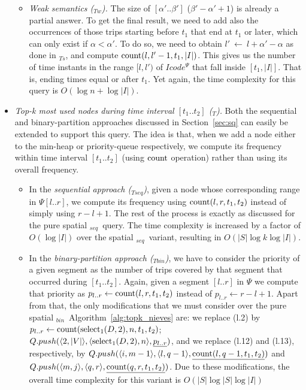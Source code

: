 \begin{itemize}
\begin{itemize}
			
			\item {\em Weak semantics (\XtoY$_{Tw}$).}
			The size of $[\alpha'..\beta']$ ($\beta' - \alpha' + 1$) is already a partial answer. To get the final result, we need to add 
			also the occurrences of those trips starting before $t_1$ that end at $t_1$ or later, which can only exist if $\alpha<\alpha'$. 
			To do so, we need to obtain $l'~\leftarrow~l+\alpha'-\alpha$ as done in \XtoY$_{Ts}$, and compute $\operatorname{count}(l,l'-1, t_1, |I|)$. This gives us the number of time instants in the range $[l,l')$ of  $Icode^{\Psi}$ that fall inside $[t_1, |I|]$. 
			That is, ending times equal or after $t_1$. Yet again, the time complexity for this query is $O(\log n + \log|I|)$.
		\end{itemize}
		
		


	\item {\em Top-k most used nodes during  time interval $[t_1..t_2]$ (\topK$_T$).}
	Both the sequential and binary-partition approaches discussed in Section~\ref{sec:sq} can easily
	be extended to support this query. The idea is that, when we add a node either to the min-heap or priority-queue
	respectively, we compute its frequency within time interval $[t_1..t_2]$ (using $\operatorname{count}$ operation) 
	rather than using its overall frequency.

	\begin{itemize}
		\item In the {\em sequential approach (\topK$_{Tseq}$)}, given a node whose corresponding range
		in $\Psi[l..r]$, we compute its frequency using $\operatorname{count}(l,r,t_1,t_2)$ instead of simply using  $r-l+1$. 
		The rest of the process is exactly as discussed for the pure spatial \topK$_{seq}$\ query. The time complexity is increased by a factor of $O(\log|I|)$ over the spatial \topK$_{seq}$\ variant, resulting in $O(|S|\log k\log|I|)$.
		
		\item In the {\em binary-partition approach (\topK$_{Tbin}$)}, we have to consider the priority of a
		given segment as the number of trips covered by that segment that occurred during $[t_1..t_2]$. Again, given
		a segment $[l..r]$ in $\Psi$ we compute that priority as $p_{l..r} \leftarrow \operatorname{count}(l,r,t_1,t_2)$ instead of 
		$p_{l..r} \leftarrow  r-l+1$. Apart from
		that, the only modifications that we must consider over the pure spatial \topK$_{bin}$\ Algorithm~\ref{alg:topk_nieves} are:
		we replace (l.2) by $p_{l..r} \leftarrow \operatorname{count}(\operatorname{select}_1(D,2),n,t_1,t_2)$; $Q.push(\langle2, |V|\rangle, \langle \operatorname{select}_1(D,2), n\rangle, \underline{p_{l..r}})$,
		and we replace  (l.12) and (l.13), respectively, by 
		   $ Q.push(\langle i, m-1 \rangle, \langle l, q-1 \rangle, \underline{\operatorname{count}(l,q-1,t_1,t_2)})$ and
		   $ Q.push(\langle m,   j \rangle, \langle q,   r \rangle, \underline{\operatorname{count}(q,r,t_1,t_2)})$. Due to these modifications, the overall time complexity for this variant is $O(|S|\log|S|\log|I|)$
		

\end{itemize}
\end{itemize}
